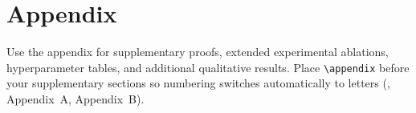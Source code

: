 \appendix

\section{Appendix}
\label{sec:appendix}

Use the appendix for supplementary proofs, extended experimental ablations, hyperparameter tables, and additional qualitative results. Place \texttt{\textbackslash appendix} before your supplementary sections so numbering switches automatically to letters (\eg, Appendix~A, Appendix~B).
